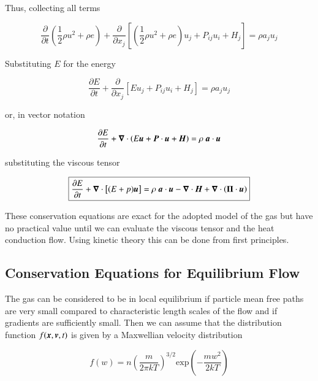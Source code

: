 \noindent Thus, collecting all terms 

\begin{equation}
\frac{\partial }{\partial t} \left(\frac{1}{2}\rho u^2 + \rho e \right) + \frac{\partial}{\partial x_j}\left[ \left(\frac{1}{2}\rho u^2 + \rho e \right)u_j + P_{ij}u_i + H_j\right] = \rho a_j u_j 
\end{equation}

\noindent Substituting $E$ for the energy 

\begin{equation}
\frac{\partial E}{\partial t} + \frac{\partial}{\partial x_j}\left[ E u_j + P_{ij}u_i + H_j\right] = \rho a_j u_j 
\end{equation}

\noindent or, in vector notation 

\begin{equation}
\frac{\partial E}{\partial t} + \del \cdot \left( E \v{u} + \v{P}\cdot\v{u} + \v{H}\right) = \rho \ \v{a}\cdot\v{u} 
\end{equation}

\noindent substituting the viscous tensor 

\begin{equation}
\boxed{
\frac{\partial E}{\partial t} + {\boldsymbol{\nabla}} \cdot \left[ (E+p) {\boldsymbol{u}} \right] = \rho \ {\boldsymbol{a}}\cdot{\boldsymbol{u}}  - {\boldsymbol{\nabla}}\cdot {\boldsymbol{H}} + {\boldsymbol{\nabla}} \cdot \left({\boldsymbol{\Pi}}\cdot{\boldsymbol{u}}\right)
}
\end{equation}

\noindent These conservation equations are exact for the adopted model of the gas but have no practical value until we can evaluate the viscous tensor and the heat conduction flow. Using kinetic theory this can be done from first principles.


\subsection{Conservation Equations for Equilibrium Flow}

The gas can be considered to be in local equilibrium if particle mean free paths are very small compared to characteristic length scales of the flow and if gradients are sufficiently small. Then we can assume that the distribution function $f({\boldsymbol{x}},{\boldsymbol{v}},t)$ is given by a Maxwellian velocity distribution

\begin{equation}
f(w) =  n \left(\frac{m}{2\pi k T}\right)^{3/2} \mathrm{exp}\left(-\frac{mw^2}{2kT}\right)
\end{equation}

